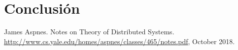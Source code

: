 \documentclass[12pt,a4paper]{article}
\begin{document}
\section{Conclusión}{}

\begin{thebibliography}{}

James Aspnes. Notes on Theory of Distributed Systems.
\href{http://www.cs.yale.edu/homes/aspnes/classes/465/notes.pdf}
{http://www.cs.yale.edu/homes/aspnes/classes/465/notes.pdf}, October 2018.

\end{thebibliography}
\end{document}

